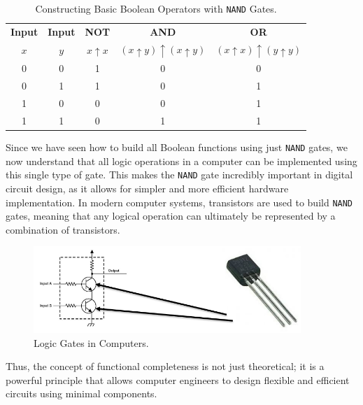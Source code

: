 \begin{table}[h!]
    \begin{center}
    \renewcommand{\arraystretch}{1.5} %
    \begin{tabular}{|c|c|c|c|c|}
    \textbf{Input} & \textbf{Input} & \textbf{NOT} & \textbf{AND} & \textbf{OR} \\
    $x$ & $y$ & $x \uparrow x$ & $(x \uparrow y) \uparrow (x \uparrow y)$ & $(x \uparrow x) \uparrow (y \uparrow y)$ \\
    \hline
    0 & 0 & 1 & 0 & 0 \\
    0 & 1 & 1 & 0 & 1 \\
    1 & 0 & 0 & 0 & 1 \\
    1 & 1 & 0 & 1 & 1 \\
    \end{tabular}
    \end{center}
    \caption{Constructing Basic Boolean Operators with \texttt{NAND} Gates.}
\end{table}

Since we have seen how to build all Boolean functions using just \texttt{NAND} gates, we now understand that all logic operations in a computer can be implemented using this single type of gate. This makes the \texttt{NAND} gate incredibly important in digital circuit design, as it allows for simpler and more efficient hardware implementation. In modern computer systems, transistors are used to build \texttt{NAND} gates, meaning that any logical operation can ultimately be represented by a combination of transistors.

\begin{figure}[h!]
    \centering
    \includegraphics[width = 0.9\textwidth]{figure/logicincomp.png} %
    \caption{Logic Gates in Computers.}
    \label{fig:logincom}
\end{figure}

Thus, the concept of functional completeness is not just theoretical; it is a powerful principle that allows computer engineers to design flexible and efficient circuits using minimal components.

